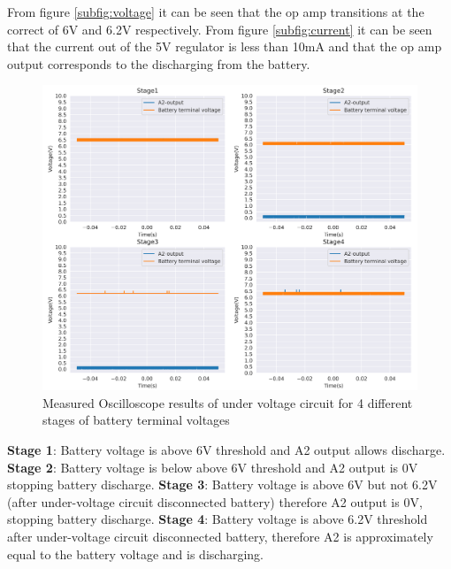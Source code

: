 From figure \ref{subfig:voltage} it can be seen that the op amp transitions at the correct of 6V and 6.2V respectively. From figure \ref{subfig:current} it can be seen that the current out of the 5V regulator is less than 10mA and that the op amp output corresponds to the discharging from the battery. 


\begin{figure}[!htb]
\centering
\includegraphics[scale=0.048]{./Figures/meas2.png}
\caption{Measured Oscilloscope results of under voltage circuit for 4 different stages of battery terminal voltages}
\label{fig:Oscil}
\end{figure}
\begin{flushleft}
\textbf{Stage 1}: Battery voltage is above 6V threshold and A2 output allows discharge.\newline
\textbf{Stage 2}: Battery voltage is below above 6V threshold and A2 output is 0V stopping battery discharge.\newline
\textbf{Stage 3}: Battery voltage is above 6V but not 6.2V (after under-voltage circuit disconnected battery) therefore A2 output is 0V, stopping battery discharge.\newline
\textbf{Stage 4}: Battery voltage is above 6.2V threshold after under-voltage circuit disconnected battery, therefore A2 is approximately equal to the battery voltage and is discharging.\newline
\end{flushleft}



